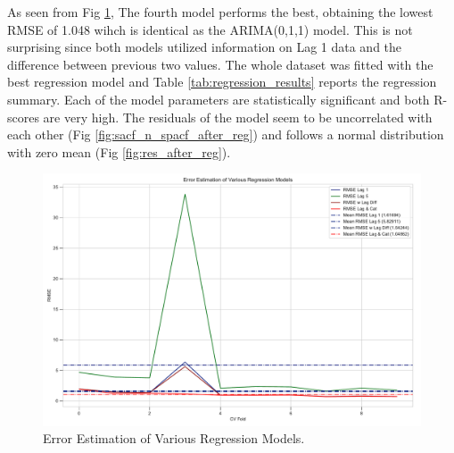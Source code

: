 \documentclass[]{article}
\begin{document}
As seen from Fig \ref{fig:error_estimation_3}, The fourth model performs the best, obtaining the lowest RMSE of 1.048 wihch is identical as the ARIMA(0,1,1) model. This is not surprising since both models utilized information on Lag 1 data and the difference between previous two values. The whole dataset was fitted with the best regression model and Table \ref{tab:regression_results} reports the regression summary. Each of the model parameters are statistically significant and both R-scores are very high. The residuals of the model seem to be uncorrelated with each other (Fig \ref{fig:sacf_n_spacf_after_reg}) and follows a normal distribution with zero mean (Fig \ref{fig:res_after_reg}). 

%
\begin{figure}[ht]
	\centering
	\includegraphics[width=1\columnwidth]{../Figures/error_estimation_3.pdf}
	\caption{Error Estimation of Various Regression Models.}
	\label{fig:error_estimation_3}
\end{figure}
%
\end{document}
